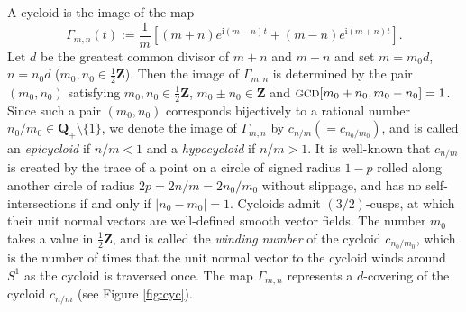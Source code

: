 \documentclass[a4paper]{amsart}
\theoremstyle{plain}
\theoremstyle{remark}
\numberwithin{equation}{section}
\begin{document}
A cycloid is the image of the map 
 \[
      {\varGamma}_{m,n}(t):=
      \frac{1}{m}
      \left[(m+n)e^{{\mathrm{i}}(m-n)t}
              +(m-n)e^{{\mathrm{i}}(m+n)t}\right]. 
 \]
Let $d$ be the greatest common divisor of $m+n$ and $m-n$ and set 
$m=m_0d$, $n=n_0 d$ ($m_0,n_0\in \frac12{\boldsymbol{Z}}$).
Then the image of ${\varGamma}_{m,n}$ is determined by the pair 
$(m_0,n_0)$ satisfying $m_0,n_0 \in \frac12{\boldsymbol{Z}}$,
$m_0\pm n_0\in {\boldsymbol{Z}}$ and
${\operatorname{\mbox{\footnotesize{GCD}}}}[m_0+n_0,m_0-n_0]=1$.
Since such a pair $(m_0,n_0)$ corresponds bijectively 
to a rational number $n_0/m_0\in {\boldsymbol{Q}}_+\setminus\{1\}$, 
we denote the image of ${\varGamma}_{m,n}$ by $c_{n/m}(=c_{n_0/m_0})$,
and is called an {\it epicycloid\/} if $n/m<1$ and
a {\it hypocycloid\/} if $n/m>1$.
It is well-known that $c_{n/m}$ is created by the trace of a point on a
circle of signed radius 
$1-p$ 
rolled along another circle of radius
$2p=2n/m=2n_0/m_0$ without slippage, 
and has no self-intersections if and only if $|n_0-m_0|=1$.
Cycloids admit $(3/2)$-cusps, at which their unit normal vectors are
well-defined smooth vector fields.
The number $m_0$ takes a value in $\frac12{\boldsymbol{Z}}$, and is called 
the {\it winding number\/} of the cycloid $c_{n_0/m_0}$, 
which is the number of times that the unit normal vector to the cycloid
winds around $S^1$ as the cycloid is traversed once.  
The map ${\varGamma}_{m,n}$ represents a $d$-covering of the cycloid $c_{n/m}$ 
(see Figure \ref{fig:cyc}).
\end{document}
